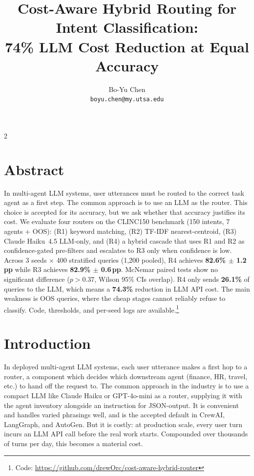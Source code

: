 \documentclass[11pt,a4paper]{article}
\title{\textbf{Cost-Aware Hybrid Routing for Intent Classification:\\74\% LLM Cost Reduction at Equal Accuracy}}
\author{
  Bo-Yu Chen\\
  \texttt{boyu.chen@my.utsa.edu}
}
\date{}
\begin{document}
\maketitle
\begin{multicols}{2}

\section*{Abstract}

In multi-agent LLM systems, user utterances must be routed to the correct task agent as a first step. The common approach is to use an LLM as the router. This choice is accepted for its accuracy, but we ask whether that accuracy justifies its cost. We evaluate four routers on the CLINC150 benchmark (150 intents, 7 agents + OOS): (R1) keyword matching, (R2) TF-IDF nearest-centroid, (R3) Claude Haiku~4.5 LLM-only, and (R4) a hybrid cascade that uses R1 and R2 as confidence-gated pre-filters and escalates to R3 only when confidence is low. Across 3 seeds $\times$ 400 stratified queries (1,200 pooled), R4 achieves \textbf{82.6\% $\pm$ 1.2\,pp} while R3 achieves \textbf{82.9\% $\pm$ 0.6\,pp}. McNemar paired tests show no significant difference ($p > 0.37$, Wilson 95\% CIs overlap). R4 only sends \textbf{26.1\%} of queries to the LLM, which means a \textbf{74.3\%} reduction in LLM API cost. The main weakness is OOS queries, where the cheap stages cannot reliably refuse to classify. Code, thresholds, and per-seed logs are available.\footnote{Code: \url{https://github.com/drewOrc/cost-aware-hybrid-router}}

\section{Introduction}

In deployed multi-agent LLM systems, each user utterance makes a first hop to a router, a component which decides which downstream agent (finance, HR, travel, etc.) to hand off the request to. The common approach in the industry is to use a compact LLM like Claude Haiku or GPT-4o-mini as a router, supplying it with the agent inventory alongside an instruction for JSON-output. It is convenient and handles varied phrasings well, and is the accepted default in CrewAI, LangGraph, and AutoGen. But it is costly: at production scale, every user turn incurs an LLM API call before the real work starts. Compounded over thousands of turns per day, this becomes a material cost.


\end{multicols}
\end{document}
